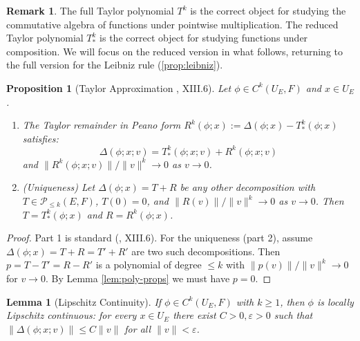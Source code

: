 \documentclass[10pt,a4paper]{article}
\theoremstyle{plain}
\newtheorem{lemma}[theorem]{Lemma}
\newtheorem{proposition}[theorem]{Proposition}
\theoremstyle{definition}
\newtheorem{remark}[theorem]{Remark}
\newcommand{\1}{\mathbb{1}} %
\newcommand{\ra}{\rightarrow} %
\newcommand{\eps}{\varepsilon} %
\begin{document}
\begin{remark}

The full Taylor polynomial \(T^k\) is the correct object for studying
the commutative algebra of functions under pointwise multiplication. The
reduced Taylor polynomial \(T_{\ast}^k\) is the correct object for
studying functions under composition. We will focus on the reduced
version in what follows, returning to the full version for the Leibniz
rule (\ref{prop:leibniz}).

\end{remark}

\begin{proposition}[Taylor Approximation \citep{LangRFA}, XIII.6]

\label{prop:taylor} Let \(\phi \in C^k(U_E, F)\) and \(x \in U_E\).

\begin{enumerate}
\def\labelenumi{\arabic{enumi}.}
\item
  The Taylor remainder in Peano form
  \(R^k(\phi; x) := \Delta(\phi; x) - T_{\ast}^k(\phi; x)\) satisfies:
  \[
   \Delta(\phi; x; v) = T_{\ast}^k(\phi; x; v) + R^k(\phi; x; v)
   \] and \(\|R^k(\phi; x; v)\|/\|v\|^k \to 0\) as \(v \to 0\).
\item
  (Uniqueness) Let \(\Delta(\phi; x) = T + R\) be any other
  decomposition with \(T \in \mathcal{P}_{\leq k}(E,F)\), \(T(0) = 0\),
  and \(\|R(v)\|/\|v\|^k \ra 0\) as \(v \ra 0\). Then
  \(T = T_{\ast}^k(\phi; x)\) and \(R = R^k(\phi; x)\).
\end{enumerate}

\end{proposition}

\begin{proof}

Part 1 is standard (\citep{LangRFA}, XIII.6). For the uniqueness (part
2), assume \(\Delta(\phi; x) = T + R = T' + R'\) are two such
decompositions. Then \(p = T-T' = R-R'\) is a polynomial of degree
\(\leq k\) with \(\|p(v)\|/\|v\|^k \ra 0\) for \(v \ra 0\). By Lemma
\ref{lem:poly-props} we must have \(p = 0\).

\end{proof}

\begin{lemma}[Lipschitz Continuity]

\label{lem:lipschitz} If \(\phi \in C^k(U_E, F)\) with \(k \geq 1\),
then \(\phi\) is locally Lipschitz continuous: for every \(x \in U_E\)
there exist \(C > 0, \eps > 0\) such that
\(\| \Delta(\phi; x; v) \| \leq C \|v\|\) for all \(\|v\| < \eps\).

\end{lemma}
\end{document}

